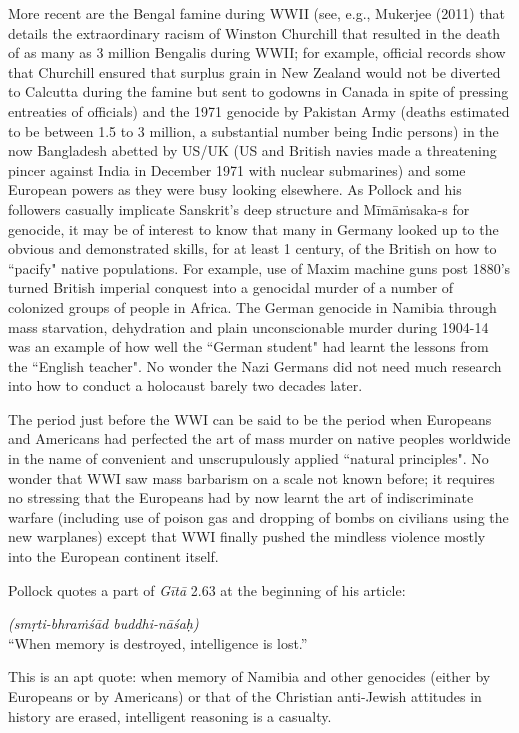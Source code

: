 More recent are the Bengal famine during WWII (see, e.g., Mukerjee (2011) that details the extraordinary racism of Winston Churchill that resulted in the death of as many as 3 million Bengalis during WWII; for example, official records show that Churchill ensured that surplus grain in New Zealand would not be diverted to Calcutta during the famine but sent to godowns in Canada in spite of pressing entreaties of officials) and the 1971 genocide by Pakistan Army (deaths estimated to be between 1.5 to 3 million, a substantial number being Indic persons) in the now Bangladesh abetted by US/UK (US and British navies made a threatening pincer against India in December 1971 with nuclear submarines) and some European powers as they were busy looking elsewhere. As Pollock and his followers casually implicate Sanskrit's deep structure and Mīmāṁsaka-s for genocide, it may be of interest to know that many in Germany looked up to the obvious and demonstrated skills, for at least 1 century, of the British on how to ``pacify" native populations. For example, use of Maxim machine guns post 1880's turned British imperial conquest into a genocidal murder of a number of colonized groups of people in Africa. The German genocide in Namibia through mass starvation, dehydration and plain unconscionable murder during 1904-14 was an example of how well the ``German student" had learnt the lessons from the ``English teacher". No wonder the Nazi Germans did not need much research into how to conduct a holocaust barely two decades later.

The period just before the WWI can be said to be the period when Europeans and Americans had perfected the art of mass murder on native peoples worldwide in the name of convenient and unscrupulously applied ``natural principles". No wonder that WWI saw mass barbarism on a scale not known before; it requires no stressing that the Europeans had by now learnt the art of indiscriminate warfare (including use of poison gas and dropping of bombs on civilians using the new warplanes) except that WWI finally pushed the mindless violence mostly into the European continent itself.

Pollock quotes a part of {\sl Gītā} 2.63 at the beginning of his article: 

\begin{myquote}
{\sl (smṛti-bhraṁśād buddhi-nāśaḥ)}\\
{\rm “When memory is destroyed, intelligence is lost.”}
\end{myquote}
This is an apt quote: when memory of Namibia and other genocides (either by Europeans or by Americans) or that of the Christian anti-Jewish attitudes in history are erased, intelligent reasoning is a casualty.

